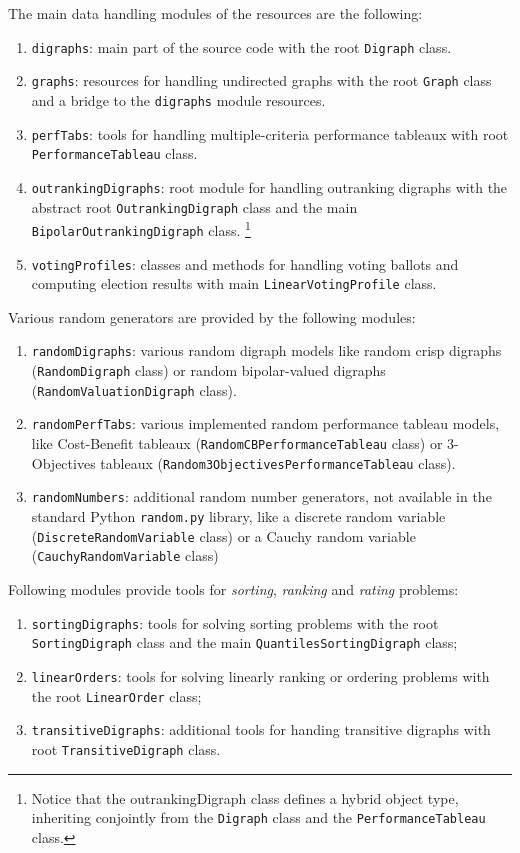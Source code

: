The main data handling modules of the \Digraph resources are the following:
\begin{enumerate}[leftmargin=0.75cm]
\item \texttt{digraphs}: main part of the \Digraph source code with the root \texttt{Digraph} class.
\item \texttt{graphs}: resources for handling undirected graphs with the root \texttt{Graph} class and a bridge to the \texttt{digraphs} module resources.
\item \texttt{perfTabs}: tools for handling multiple-criteria performance tableaux with root \texttt{PerformanceTableau} class.
\item \texttt{outrankingDigraphs}: root module for handling outranking digraphs with the abstract root \texttt{OutrankingDigraph} class and the main \texttt{Bipolar\-OutrankingDigraph} class. \footnote{Notice that the outrankingDigraph class defines a hybrid object type, inheriting conjointly from the \texttt{Digraph} class and the \texttt{PerformanceTableau} class.}
\item \texttt{votingProfiles}: classes and methods for handling voting ballots and computing election results with main \texttt{LinearVotingProfile} class.
\end{enumerate}

\noindent Various random generators are provided by the following modules:
\begin{enumerate}[leftmargin=0.75cm]
\item \texttt{randomDigraphs}: various random digraph models like random crisp digraphs (\texttt{RandomDigraph} class) or random bipolar-valued digraphs (\texttt{Random\-ValuationDigraph} class).
\item \texttt{randomPerfTabs}: various implemented random performance tableau models, like Cost-Benefit tableaux (\texttt{RandomCBPerformance\-Tableau} class) or 3-Objectives tableaux (\texttt{Random3ObjectivesPer\-formance\-Tableau} class).
\item \texttt{randomNumbers}: additional random number generators, not available in the standard Python \texttt{random.py} library, like a discrete random variable (\texttt{DiscreteRandomVariable} class) or a Cauchy random variable (\texttt{Cau\-chy\-RandomVariable} class)
\end{enumerate}

\noindent Following modules provide tools for \emph{sorting}, \emph{ranking} and \emph{rating} problems:
\begin{enumerate}[leftmargin=0.75cm]
\item \texttt{sortingDigraphs}: tools for solving sorting problems with the root \texttt{Sor\-tingDigraph} class and the main \texttt{QuantilesSortingDi\-graph} class;
\item \texttt{linearOrders}: tools for solving linearly ranking or ordering problems with the root \texttt{LinearOrder} class;
\item \texttt{transitiveDigraphs}: additional tools for handing transitive digraphs with root \texttt{TransitiveDigraph} class.
\end{enumerate}

